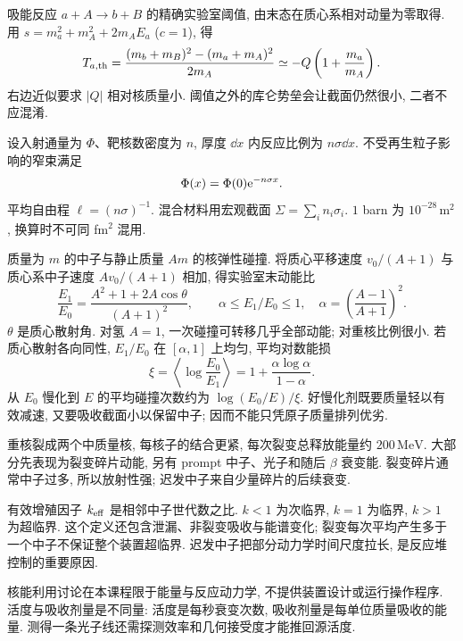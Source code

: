 \label{ch:reactions}
吸能反应 $a+A\to b+B$ 的精确实验室阈值, 由末态在质心系相对动量为零取得. 用 $s=m_a^2+m_A^2+2m_AE_a$ ($c=1$), 得
\begin{equation}
 T_{a,\rm th}=\frac{(m_b+m_B)^2-(m_a+m_A)^2}{2m_A}
 \simeq -Q\left(1+\frac{m_a}{m_A}\right).
\end{equation}
右边近似要求 $|Q|$ 相对核质量小. 阈值之外的库仑势垒会让截面仍然很小, 二者不应混淆.

设入射通量为 $\Phi$、靶核数密度为 $n$, 厚度 $\dd x$ 内反应比例为 $n\sigma\dd x$. 不受再生粒子影响的窄束满足 \begin{equation}\Phi(x)=\Phi(0)\mathrm e^{-n\sigma x}.\end{equation}平均自由程 $\ell=(n\sigma)^{-1}$. 混合材料用宏观截面 $\Sigma=\sum_i n_i\sigma_i$. $1$ barn 为 $10^{-28}\,\mathrm m^2$, 换算时不可同 fm$^2$ 混用.

质量为 $m$ 的中子与静止质量 $Am$ 的核弹性碰撞. 将质心平移速度 $v_0/(A+1)$ 与质心系中子速度 $Av_0/(A+1)$ 相加, 得实验室末动能比
\begin{equation}
 \frac{E_1}{E_0}=\frac{A^2+1+2A\cos\theta}{(A+1)^2},
 \qquad \alpha\le E_1/E_0\le1,\quad\alpha=\left(\frac{A-1}{A+1}\right)^2.
\end{equation}
$\theta$ 是质心散射角. 对氢 $A=1$, 一次碰撞可转移几乎全部动能; 对重核比例很小. 若质心散射各向同性, $E_1/E_0$ 在 $[\alpha,1]$ 上均匀, 平均对数能损
\begin{equation}
 \xi=\left\langle\log\frac{E_0}{E_1}\right\rangle
 =1+\frac{\alpha\log\alpha}{1-\alpha}.
\end{equation}
从 $E_0$ 慢化到 $E$ 的平均碰撞次数约为 $\log(E_0/E)/\xi$. 好慢化剂既要质量轻以有效减速, 又要吸收截面小以保留中子; 因而不能只凭原子质量排列优劣.

重核裂成两个中质量核, 每核子的结合更紧, 每次裂变总释放能量约 $200\,\mathrm{MeV}$. 大部分先表现为裂变碎片动能, 另有 prompt 中子、光子和随后 $\beta$ 衰变能. 裂变碎片通常中子过多, 所以放射性强; 迟发中子来自少量碎片的后续衰变.

有效增殖因子 $k_{\rm eff}$ 是相邻中子世代数之比. $k<1$ 为次临界, $k=1$ 为临界, $k>1$ 为超临界. 这个定义还包含泄漏、非裂变吸收与能谱变化; 裂变每次平均产生多于一个中子不保证整个装置超临界. 迟发中子把部分动力学时间尺度拉长, 是反应堆控制的重要原因.

核能利用讨论在本课程限于能量与反应动力学, 不提供装置设计或运行操作程序. 活度与吸收剂量是不同量: 活度是每秒衰变次数, 吸收剂量是每单位质量吸收的能量. 测得一条光子线还需探测效率和几何接受度才能推回源活度.

